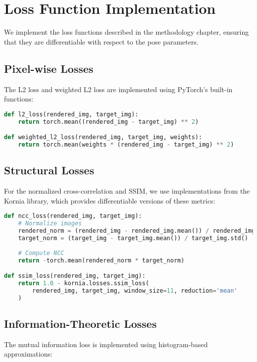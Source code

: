 \section{Loss Function Implementation}
We implement the loss functions described in the methodology chapter, ensuring that they are differentiable with respect to the pose parameters.

\subsection{Pixel-wise Losses}
The L2 loss and weighted L2 loss are implemented using PyTorch's built-in functions:

\begin{lstlisting}[language=Python]
def l2_loss(rendered_img, target_img):
    return torch.mean((rendered_img - target_img) ** 2)

def weighted_l2_loss(rendered_img, target_img, weights):
    return torch.mean(weights * (rendered_img - target_img) ** 2)
\end{lstlisting}

\subsection{Structural Losses}
For the normalized cross-correlation and SSIM, we use implementations from the Kornia library, which provides differentiable versions of these metrics:

\begin{lstlisting}[language=Python]
def ncc_loss(rendered_img, target_img):
    # Normalize images
    rendered_norm = (rendered_img - rendered_img.mean()) / rendered_img.std()
    target_norm = (target_img - target_img.mean()) / target_img.std()
    
    # Compute NCC
    return -torch.mean(rendered_norm * target_norm)

def ssim_loss(rendered_img, target_img):
    return 1.0 - kornia.losses.ssim_loss(
        rendered_img, target_img, window_size=11, reduction='mean'
    )
\end{lstlisting}

\subsection{Information-Theoretic Losses}
The mutual information loss is implemented using histogram-based approximations:

